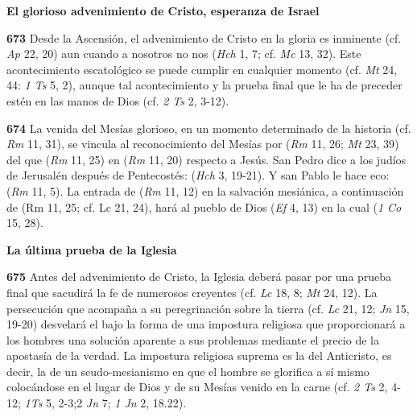 \begin{body}
\textbf{El glorioso advenimiento de Cristo, esperanza de Israel}

\textbf{673} Desde la Ascensión, el advenimiento de Cristo en la gloria es inminente (cf. \emph{Ap} 22, 20) aun cuando a nosotros no nos  (\emph{Hch} 1, 7; cf. \emph{Mc} 13, 32). Este acontecimiento escatológico se puede cumplir en cualquier momento (cf. \emph{Mt} 24, 44: \emph{1 Ts} 5, 2), aunque tal acontecimiento y la prueba final que le ha de preceder estén  en las manos de Dios (cf. \emph{2 Ts} 2, 3-12).

\textbf{674} La venida del Mesías glorioso, en un momento determinado de la historia (cf. \emph{Rm} 11, 31), se vincula al reconocimiento del Mesías por  (\emph{Rm} 11, 26; \emph{Mt} 23, 39) del que  (\emph{Rm} 11, 25) en  (\emph{Rm} 11, 20) respecto a Jesús. San Pedro dice a los judíos de Jerusalén después de Pentecostés:  (\emph{Hch} 3, 19-21). Y san Pablo le hace eco:  (\emph{Rm} 11, 5). La entrada de  (\emph{Rm} 11, 12) en la salvación mesiánica, a continuación de  (Rm 11, 25; cf. Lc 21, 24), hará al pueblo de Dios  (\emph{Ef} 4, 13) en la cual  (\emph{1 Co} 15, 28).

\textbf{La última prueba de la Iglesia}

\textbf{675} Antes del advenimiento de Cristo, la Iglesia deberá pasar por una prueba final que sacudirá la fe de numerosos creyentes (cf. \emph{Lc} 18, 8; \emph{Mt} 24, 12). La persecución que acompaña a su peregrinación sobre la tierra (cf. \emph{Lc} 21, 12; \emph{Jn} 15, 19-20) desvelará el  bajo la forma de una impostura religiosa que proporcionará a los hombres una solución aparente a sus problemas mediante el precio de la apostasía de la verdad. La impostura religiosa suprema es la del Anticristo, es decir, la de un seudo-mesianismo en que el hombre se glorifica a sí mismo colocándose en el lugar de Dios y de su Mesías venido en la carne (cf. \emph{2 Ts} 2, 4-12; \emph{1Ts} 5, 2-3;2 \emph{Jn} 7; \emph{1 Jn} 2, 18.22).




\end{body}
